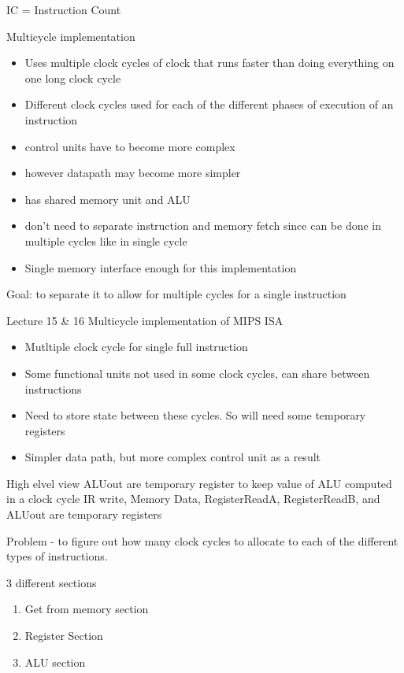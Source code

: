 \documentclass{article}
\begin{document}
			IC = Instruction Count

		Multicycle implementation
		\begin{itemize}
			\item Uses multiple clock cycles of clock that runs faster than doing everything on one long clock cycle
			\item Different clock cycles used for each of the different phases of execution of an instruction
			\item control units have to become more complex
			\item however datapath may become more simpler
		\end{itemize}

		\begin{itemize}
			\item has shared memory unit and ALU
			\item don't need to separate instruction and memory fetch since can be done in multiple cycles like in single cycle
			\item Single memory interface enough for this implementation
		\end{itemize}

			Goal: to separate it to allow for multiple cycles for a single instruction

Lecture 15 \& 16
	Multicycle implementation of MIPS ISA
		\begin{itemize}
			\item Mutltiple clock cycle for single full instruction
			\item Some functional units not used in some clock cycles, can share between instructions
			\item Need to store state between these cycles. So will need some temporary registers
			\item Simpler data path, but more complex control unit as a result
		\end{itemize}

	High elvel view
		ALUout are temporary register to keep value of ALU computed in a clock cycle
		IR write, Memory Data, RegisterReadA, RegisterReadB, and ALUout are temporary registers
		
		Problem - to figure out how many clock cycles to allocate to each of the different types of instructions.

		3 different sections 
		\begin{enumerate}
			\item Get from memory section
			\item Register Section
			\item ALU section
		\end{enumerate}
\end{document}
